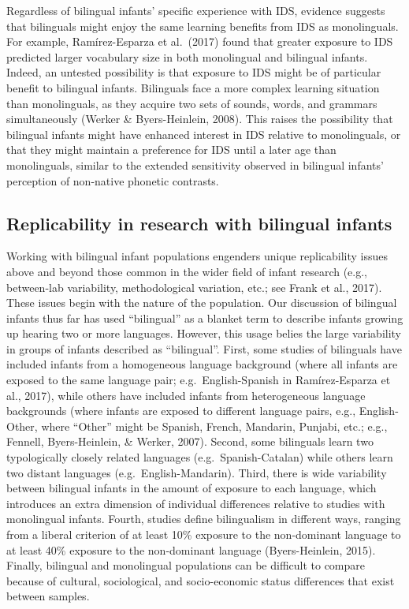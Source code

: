 \documentclass[
  english,
  ,man,floatsintext]{apa6}
\begin{document}
Regardless of bilingual infants' specific experience with IDS, evidence suggests that bilinguals might enjoy the same learning benefits from IDS as monolinguals. For example, Ramírez-Esparza et al.~(2017) found that greater exposure to IDS predicted larger vocabulary size in both monolingual and bilingual infants. Indeed, an untested possibility is that exposure to IDS might be of particular benefit to bilingual infants. Bilinguals face a more complex learning situation than monolinguals, as they acquire two sets of sounds, words, and grammars simultaneously (Werker \& Byers-Heinlein, 2008). This raises the possibility that bilingual infants might have enhanced interest in IDS relative to monolinguals, or that they might maintain a preference for IDS until a later age than monolinguals, similar to the extended sensitivity observed in bilingual infants' perception of non-native phonetic contrasts.

\hypertarget{replicability-in-research-with-bilingual-infants}{%
\subsection{Replicability in research with bilingual infants}\label{replicability-in-research-with-bilingual-infants}}

Working with bilingual infant populations engenders unique replicability issues above and beyond those common in the wider field of infant research (e.g., between-lab variability, methodological variation, etc.; see Frank et al., 2017). These issues begin with the nature of the population. Our discussion of bilingual infants thus far has used \enquote{bilingual} as a blanket term to describe infants growing up hearing two or more languages. However, this usage belies the large variability in groups of infants described as \enquote{bilingual}. First, some studies of bilinguals have included infants from a homogeneous language background (where all infants are exposed to the same language pair; e.g.~English-Spanish in Ramírez-Esparza et al., 2017), while others have included infants from heterogeneous language backgrounds (where infants are exposed to different language pairs, e.g., English-Other, where ``Other'' might be Spanish, French, Mandarin, Punjabi, etc.; e.g., Fennell, Byers-Heinlein, \& Werker, 2007). Second, some bilinguals learn two typologically closely related languages (e.g.~Spanish-Catalan) while others learn two distant languages (e.g.~English-Mandarin). Third, there is wide variability between bilingual infants in the amount of exposure to each language, which introduces an extra dimension of individual differences relative to studies with monolingual infants. Fourth, studies define bilingualism in different ways, ranging from a liberal criterion of at least 10\% exposure to the non-dominant language to at least 40\% exposure to the non-dominant language (Byers-Heinlein, 2015). Finally, bilingual and monolingual populations can be difficult to compare because of cultural, sociological, and socio-economic status differences that exist between samples.
\end{document}
